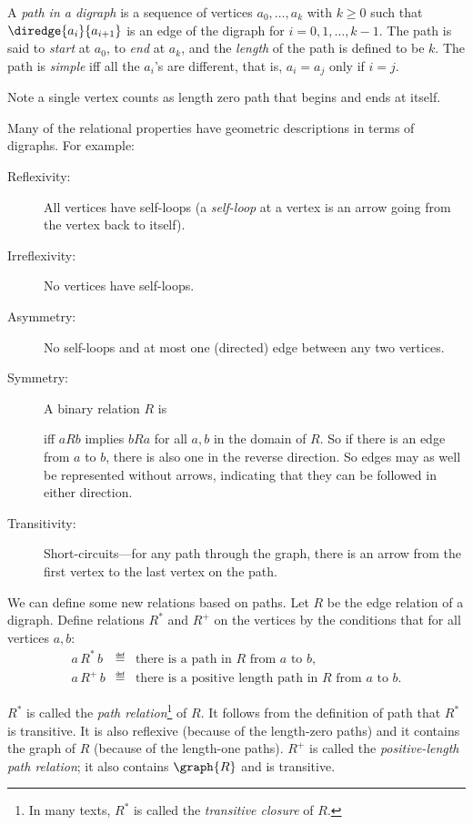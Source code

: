 \begin{definition}
A \emph{path in a digraph} is a sequence of vertices $a_0,\dots,a_k$
with $k \ge 0$ such that $\diredge{a_i}{a_{i+1}}$ is an edge of the
digraph for $i = 0,1,\dots, k-1$.  The path is said to \emph{start} at
$a_0$, to \emph{end} at $a_k$, and the \emph{length} of the path is
defined to be $k$.  The path is \emph{simple} iff all the $a_i$'s are
different, that is, $a_i = a_j$ only if $i=j$.
\end{definition}
Note a single vertex counts as length zero path that begins and ends
at itself.

Many of the relational properties have geometric descriptions in terms of
digraphs.  For example:
\begin{description}

\item[Reflexivity:] All vertices have self-loops (a \emph{self-loop} at a
vertex is an arrow going from the vertex back to itself).

\item[Irreflexivity:] No vertices have self-loops.

\item[Asymmetry:] No self-loops and at most one (directed) edge between
any two vertices.

\item[Symmetry:] A binary relation $R$ is
 iff $aRb$ implies $bRa$ for
all $a,b$ in the domain of $R$.  So if there is an edge from $a$ to $b$,
there is also one in the reverse direction.  So edges may as well be
represented without arrows, indicating that they can be followed in either
direction.

\item[Transitivity:] Short-circuits---for any path through the graph,
there is an arrow from the first vertex to the last vertex on the path.
\end{description}

We can define some new relations based on paths.  Let $R$ be the edge
relation of a digraph.  Define relations $R^*$ and $R^+$ on the vertices
by the conditions that for all vertices $a,b$:
\begin{eqnarray*}
a\, R^*\, b &\eqdef& \mbox{there is a path in $R$ from $a$ to $b$},\\
a\, R^+\, b &\eqdef& \mbox{there is a positive length path in $R$ from $a$ to $b$}.
\end{eqnarray*}

$R^*$ is called the \emph{path relation}\footnote{In many texts, $R^*$ is
called the \emph{transitive closure} of $R$.} of $R$.  It follows from the
definition of path that $R^*$ is transitive.  It is also reflexive
(because of the length-zero paths) and it contains the graph of $R$
(because of the length-one paths).  $R^+$ is called the
\emph{positive-length path relation}; it also contains $\graph{R}$ and is
transitive.

